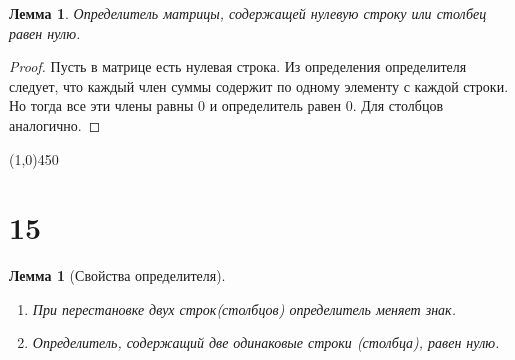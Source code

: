 \documentclass[a4paper,12pt]{article}
\newtheorem*{lem}{Лемма}
\newtheorem*{lemma}{Лемма}
\begin{document}
	\begin{lem}
		Определитель матрицы, содержащей нулевую строку или столбец равен нулю.
	\end{lem}
	\begin{proof}
		Пусть в матрице есть нулевая строка. Из определения определителя следует, что каждый член суммы содержит по одному элементу с каждой строки. Но тогда все эти члены равны 0 и определитель равен 0. Для столбцов аналогично.
	\end{proof}
	\begin{center}
		\line(1,0){450}
	\end{center}
	\section*{15}
	\begin{lemma}[Свойства определителя]
		\
		\begin{enumerate}
			\item При перестановке двух строк(столбцов) определитель меняет знак.
			\item Определитель, содержащий две одинаковые строки (столбца), равен нулю.
		\end{enumerate}
	\end{lemma}
\end{document}
